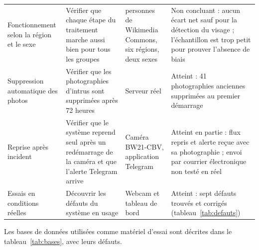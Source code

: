 \begin{table}[H]
\begin{tabularx}{\textwidth}{@{}>{\raggedright\arraybackslash}p{3.1cm}>{\raggedright\arraybackslash}X>{\raggedright\arraybackslash}p{2.7cm}>{\raggedright\arraybackslash}p{4.2cm}@{}}
Fonctionnement selon la région et le sexe & Vérifier que chaque étape du traitement marche aussi bien pour tous les groupes & 90 personnes de Wikimedia Commons, six régions, deux sexes & Non concluant : aucun écart net sauf pour la détection du visage ; l'échantillon est trop petit pour prouver l'absence de biais \\
Suppression automatique des photos & Vérifier que les photographies d'intrus sont supprimées après 72 heures & Serveur réel & Atteint : 41 photographies anciennes supprimées au premier démarrage \\
Reprise après incident & Vérifier que le système reprend seul après un redémarrage de la caméra et que l'alerte Telegram arrive & Caméra BW21-CBV, application Telegram & Atteint en partie : flux repris et alerte reçue avec sa photographie ; envoi par courrier électronique non testé en réel \\
Essais en conditions réelles & Découvrir les défauts du système en usage & Webcam et tableau de bord & Atteint : sept défauts trouvés et corrigés (tableau~\ref{tab:defauts}) \\
\bottomrule
\end{tabularx}
\end{table}

\begin{maj}
Les bases de données utilisées comme matériel d'essai sont décrites dans le tableau~\ref{tab:bases}, avec leurs défauts.
\end{maj}


